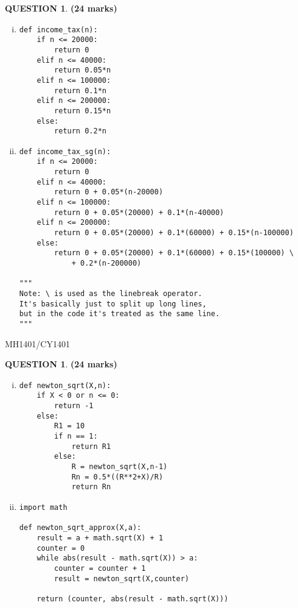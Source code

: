 \documentclass[a4paper,12pt]{article}
\theoremstyle{definition}
\newtheorem{ques}[dummy]{QUESTION}
\theoremstyle{plain}
\newcommand{\py}{python}
\begin{document}
	
	\begin{ques}\hfill\textbf{(24 marks)}\\
		\begin{enumerate}[(i)]
			\item 
			\begin{verbatim}
def income_tax(n):
    if n <= 20000:
        return 0
    elif n <= 40000:
        return 0.05*n
    elif n <= 100000:
        return 0.1*n
    elif n <= 200000:
        return 0.15*n
    else:
        return 0.2*n
			\end{verbatim}
			\item
			\begin{verbatim}
def income_tax_sg(n):
    if n <= 20000:
        return 0
    elif n <= 40000:
        return 0 + 0.05*(n-20000)
    elif n <= 100000:
        return 0 + 0.05*(20000) + 0.1*(n-40000)
    elif n <= 200000:
        return 0 + 0.05*(20000) + 0.1*(60000) + 0.15*(n-100000)
    else:
        return 0 + 0.05*(20000) + 0.1*(60000) + 0.15*(100000) \
            + 0.2*(n-200000)

"""
Note: \ is used as the linebreak operator.
It's basically just to split up long lines,
but in the code it's treated as the same line.
"""
			\end{verbatim}
		\end{enumerate}
	\end{ques}
	
	\newpage
	\hfill MH1401/CY1401\vspace*{0.5em}
	
	\begin{ques}\hfill\textbf{(24 marks)}\\
		\begin{enumerate}[(i)]
			\item 
			\begin{verbatim}
def newton_sqrt(X,n):
    if X < 0 or n <= 0:
        return -1
    else:
        R1 = 10
        if n == 1:
            return R1
        else:
            R = newton_sqrt(X,n-1)
            Rn = 0.5*((R**2+X)/R)
            return Rn
			\end{verbatim}
			\item
			\begin{verbatim}
import math

def newton_sqrt_approx(X,a):
    result = a + math.sqrt(X) + 1
    counter = 0
    while abs(result - math.sqrt(X)) > a:
        counter = counter + 1
        result = newton_sqrt(X,counter)
        
    return (counter, abs(result - math.sqrt(X)))
			\end{verbatim}
		\end{enumerate}
	\end{ques}
	
\end{document}
